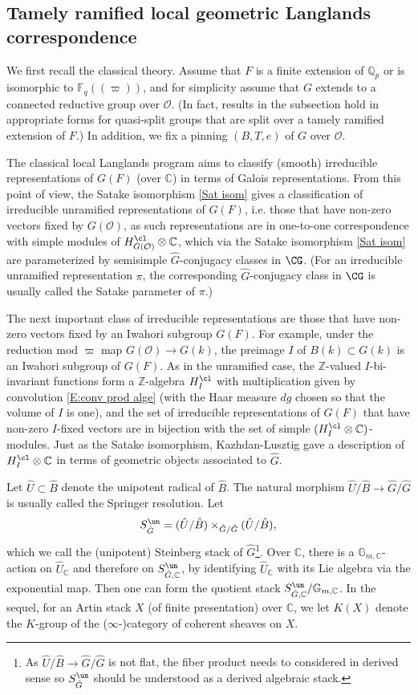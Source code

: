 \documentclass[11pt]{amsart}
\theoremstyle{definition}
\theoremstyle{definition}
\theoremstyle{definition}
\numberwithin{equation}{section}
\newcommand{\bC}{{\mathbb C}}
\newcommand{\bF}{{\mathbb F}}
\newcommand{\bG}{{\mathbb G}}
\newcommand{\bQ}{{\mathbb Q}}
\newcommand{\bZ}{{\mathbb Z}}
\newcommand{\mO}{{\mathcal O}}
\begin{document}
\subsection{Tamely ramified local geometric Langlands correspondence}\label{Tamely local}
We first recall the classical theory.  Assume that $F$ is a finite extension of $\bQ_p$ or is isomorphic to $\bF_q(\!(\varpi)\!)$, and for simplicity assume that $G$ extends to a connected reductive group over $\mO$. (In fact, results in the subsection hold in appropriate forms for quasi-split groups that are split over a tamely ramified extension of $F$.) In addition, we fix a pinning $(B,T,e)$ of $G$ over $\mO$.

The classical local Langlands program aims to classify (smooth) irreducible representations of $G(F)$ (over $\bC$) in terms of Galois representations.
From this point of view, the Satake isomorphism \eqref{Sat isom} gives a classification of irreducible unramified representations of $G(F)$, i.e. those that have non-zero vectors fixed by $G(\mO)$, as such representations are in one-to-one correspondence with simple modules of $H^{\cl}_{G(\mO)}\otimes\bC$, which via the Satake isomorphism \eqref{Sat isom} are parameterized by semisimple $\hat{G}$-conjugacy classes in $\CG$. (For an irreducible unramified representation $\pi$, the corresponding $\hat{G}$-conjugacy class in $\CG$ is usually called the Satake parameter of $\pi$.)

The next important class of irreducible representations are those that have non-zero vectors fixed by an Iwahori subgroup $G(F)$. 
For example, under the reduction mod $\varpi$ map $G(\mO)\to G(k)$, the preimage $I$ of $B(k)\subset G(k)$ is an Iwahori subgroup of $G(F)$. As in the unramified case, the $\bZ$-valued $I$-bi-invariant functions form a $\bZ$-algebra $H^{\cl}_{I}$ with multiplication given by convolution \eqref{E:conv prod alge} (with the Haar measure $dg$ chosen so that the volume of $I$ is one), and the set of irreducible representations of $G(F)$ that have non-zero $I$-fixed vectors are in bijection with the set of simple $(H^{\cl}_I\otimes\bC)$-modules.
Just as the Satake isomorphism, Kazhdan-Lusztig gave a description of $H^{\cl}_{I}\otimes\bC$ in terms of geometric objects associated to $\hat{G}$.

Let $\hat{U}\subset\hat{B}$ denote the unipotent radical of $\hat{B}$. The natural morphism $\hat{U}/\hat{B}\to \hat{G}/\hat{G}$ is usually called the Springer resolution.
Let 
\[
S^{\un}_{\hat{G}}=(\hat{U}/\hat{B})\times_{\hat{G}/\hat{G}}(\hat{U}/\hat{B}),
\] 
which we call the (unipotent) Steinberg stack of $\hat{G}$\footnote{As $\hat{U}/\hat{B}\to \hat{G}/\hat{G}$ is not flat, the fiber product needs to considered in derived sense so $S^{\un}_{\hat{G}}$ should be understood as a derived algebraic stack.}. Over $\bC$, there is a $\bG_{m,\bC}$-action on $\hat{U}_\bC$ and therefore on $S^{\un}_{\hat{G},\bC}$, by identifying $\hat{U}_\bC$ with its Lie algebra via the exponential map. Then one can form the quotient stack $S^{\un}_{\hat{G},\bC}/\bG_{m,\bC}$. In the sequel, for an Artin stack $X$ (of finite presentation) over $\bC$, we let $K(X)$ denote the  $K$-group of the ($\infty$-)category of coherent sheaves on $X$.
\end{document}

